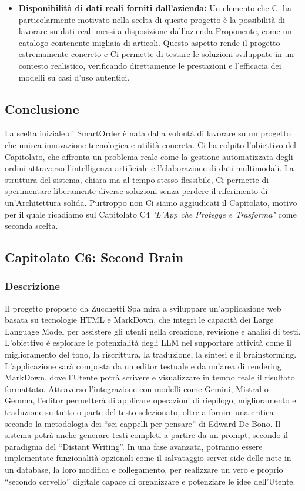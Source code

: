 \documentclass[a4paper,12pt]{article}
\begin{document}
\begin{itemize}
    \item \textbf{Disponibilità di dati reali forniti dall’azienda:} Un elemento che Ci ha particolarmente motivato nella scelta di questo progetto è la possibilità di lavorare su dati reali messi a disposizione dall’azienda Proponente, come un catalogo contenente migliaia di articoli. Questo aspetto rende il progetto estremamente concreto e Ci permette di testare le soluzioni sviluppate in un contesto realistico, verificando direttamente le prestazioni e l’efficacia dei modelli su casi d’uso autentici.
\end{itemize}

\subsection{Conclusione}
La scelta iniziale di SmartOrder è nata dalla volontà di lavorare su un progetto che unisca innovazione tecnologica e utilità concreta. Ci ha colpito l’obiettivo del Capitolato, che affronta un problema reale come la gestione automatizzata degli ordini attraverso l’intelligenza artificiale e l’elaborazione di dati multimodali. La struttura del sistema, chiara ma al tempo stesso flessibile, Ci permette di sperimentare liberamente diverse soluzioni senza perdere il riferimento di un’Architettura solida. Purtroppo non Ci siamo aggiudicati il Capitolato, motivo per il quale ricadiamo sul Capitolato C4 \textit{"L'App che Protegge e Trasforma"} come seconda scelta.


\subsection{Capitolato C6: Second Brain}

\subsubsection{Descrizione}
Il progetto proposto da Zucchetti Spa mira a sviluppare un’applicazione web basata su tecnologie HTML e MarkDown, che integri le capacità dei Large Language Model per assistere gli utenti nella creazione, revisione e analisi di testi. L’obiettivo è esplorare le potenzialità degli LLM nel supportare attività come il miglioramento del tono, la riscrittura, la traduzione, la sintesi e il brainstorming.  
L’applicazione sarà composta da un editor testuale e da un’area di rendering MarkDown, dove l’Utente potrà scrivere e visualizzare in tempo reale il risultato formattato. Attraverso l’integrazione con modelli come Gemini, Mistral o Gemma, l’editor permetterà di applicare operazioni di riepilogo, miglioramento e traduzione su tutto o parte del testo selezionato, oltre a fornire una critica secondo la metodologia dei “sei cappelli per pensare” di Edward De Bono.  
Il sistema potrà anche generare testi completi a partire da un prompt, secondo il paradigma del “Distant Writing”. In una fase avanzata, potranno essere implementate funzionalità opzionali come il salvataggio server side delle note in un database, la loro modifica e collegamento, per realizzare un vero e proprio “secondo cervello” digitale capace di organizzare e potenziare le idee dell’Utente.
\end{document}

